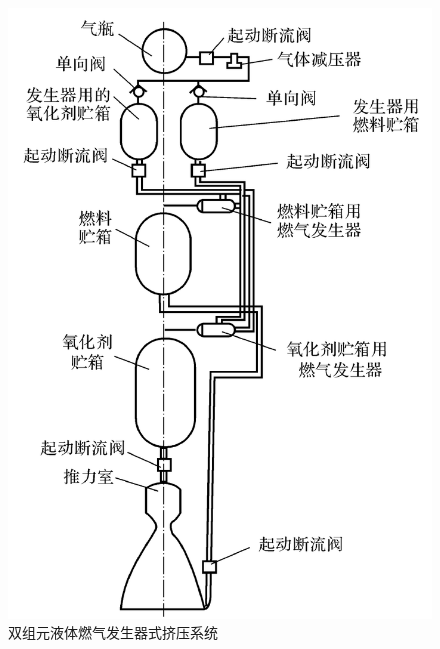 \begin{enumerate}[\hspace*{1.5em} (1) ]
	\begin{figure}[!htb]
		\centering
		\includegraphics[width=0.4\linewidth]{pic/双组元液体.png}
		\caption{双组元液体燃气发生器式挤压系统}
		\label{双组元}
	\end{figure}
	

\end{enumerate}
